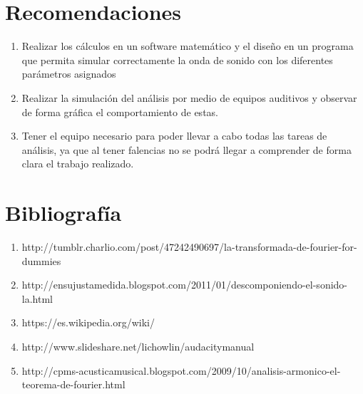 \documentclass[10pt,a4paper]{book}
\begin{document}
\section{Recomendaciones}

\begin{enumerate}
\item Realizar los cálculos en un software matemático y el diseño en un programa que permita simular correctamente la onda de sonido con los diferentes parámetros asignados
\item Realizar la simulación del análisis por medio de equipos auditivos y observar de forma gráfica el comportamiento de estas.
\item Tener el equipo necesario para poder llevar a cabo todas las tareas de análisis, ya que al tener falencias no se podrá llegar a comprender de forma clara el trabajo realizado.

\end{enumerate}

\section{Bibliografía}

\begin{enumerate}
\item http://tumblr.charlio.com/post/47242490697/la-transformada-de-fourier-for-dummies
\item http://ensujustamedida.blogspot.com/2011/01/descomponiendo-el-sonido-la.html
\item https://es.wikipedia.org/wiki/
\item http://www.slideshare.net/lichowlin/audacitymanual
\item http://cpms-acusticamusical.blogspot.com/2009/10/analisis-armonico-el-teorema-de-fourier.html
\end{enumerate}
\end{document}
